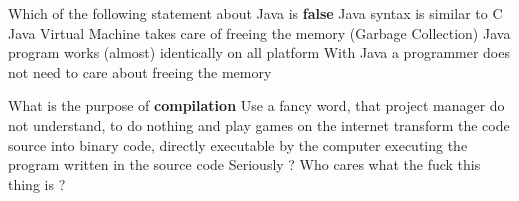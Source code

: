 \begin{question}{Which of the following statement about Java is \textbf{false}}
  \false Java syntax is similar to C
  \false Java Virtual Machine takes care of freeing the memory (Garbage Collection)
  \false Java program works (almost) identically on all platform
  \true With Java a programmer does not need to care about freeing the memory
\end{question}

\begin{question}{What is the purpose of \textbf{compilation}}
  \false Use a fancy word, that project manager do not understand, to do nothing and play games on
  the internet
  \false transform the code source into binary code, directly executable by the computer
  \false executing the program written in the source code
  \true Seriously ? Who cares what the fuck this thing is ?
\end{question}
